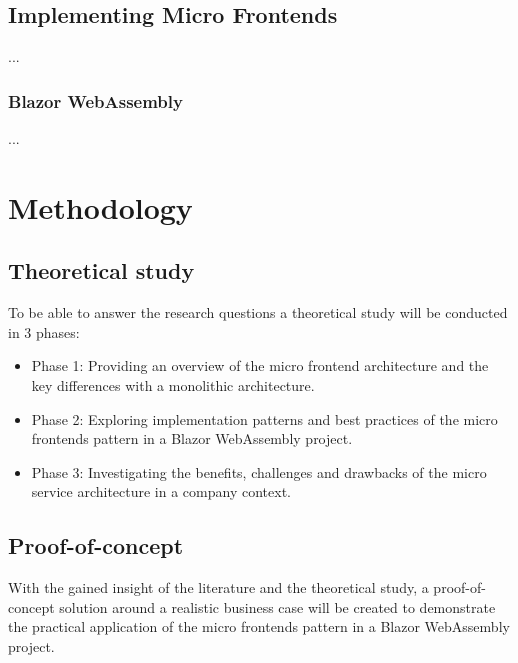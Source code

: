\subsection{Implementing Micro Frontends}
...
\subsubsection{Blazor WebAssembly}
...




\section{Methodology}
\label{sec:methodology}


\subsection{Theoretical study}
To be able to answer the research questions a theoretical study will be
conducted in 3 phases:
\begin{itemize}
    \item Phase 1: Providing an overview of the micro frontend architecture and
    the key differences with a monolithic architecture.
    \item Phase 2: Exploring implementation patterns and best practices of the
    micro frontends pattern  in a Blazor WebAssembly project.
    \item Phase 3: Investigating the benefits, challenges and drawbacks of the
    micro service architecture in a company context.
\end{itemize}

\subsection{Proof-of-concept}
With the gained insight of the literature and the theoretical study, a
proof-of-concept solution around a realistic business case will be created to
demonstrate the practical application of the micro frontends pattern in a Blazor
WebAssembly project.

